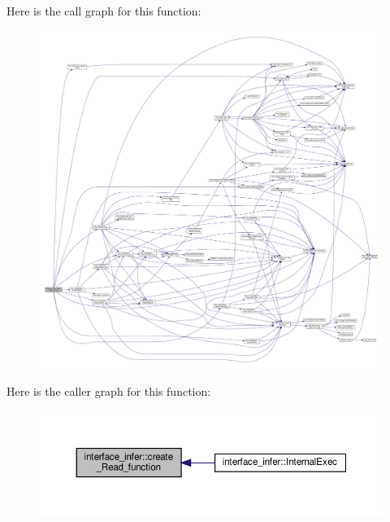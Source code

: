 Here is the call graph for this function\+:
\nopagebreak
\begin{figure}[H]
\begin{center}
\leavevmode
\includegraphics[width=350pt]{d9/d8a/classinterface__infer_a99d0aeddc3181d958d1ecc3df7f298a7_cgraph}
\end{center}
\end{figure}
Here is the caller graph for this function\+:
\nopagebreak
\begin{figure}[H]
\begin{center}
\leavevmode
\includegraphics[width=350pt]{d9/d8a/classinterface__infer_a99d0aeddc3181d958d1ecc3df7f298a7_icgraph}
\end{center}
\end{figure}
\mbox{\label{classinterface__infer_adaa76ea6635a0d64f796b9ff84da3d4b}} 

